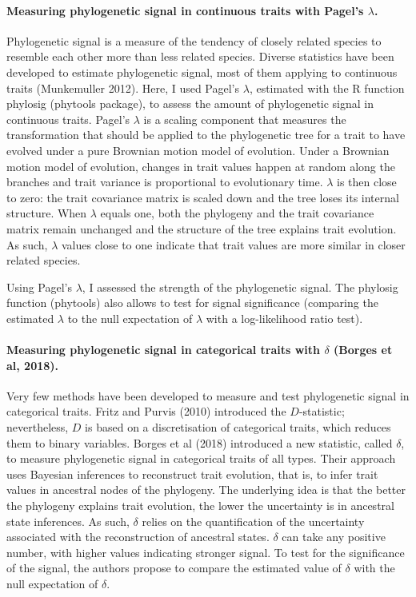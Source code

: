 \paragraph{Measuring phylogenetic signal in continuous traits with Pagel's $\lambda$.}
Phylogenetic signal is a measure of the tendency of closely related species to resemble each other more than less related species. Diverse statistics have been developed to estimate phylogenetic signal, most of them applying to continuous traits (Munkemuller 2012). Here, I used Pagel's $\lambda$, estimated with the R function phylosig (phytools package), to assess the amount of phylogenetic signal in continuous traits. Pagel's $\lambda$ is a scaling component that measures the transformation that should be applied to the phylogenetic tree for a trait to have evolved under a pure Brownian motion model of evolution. Under a Brownian motion model of evolution, changes in trait values happen at random along the branches and trait variance is proportional to evolutionary time.  $\lambda$ is then close to zero: the trait covariance matrix is scaled down and the tree loses its internal structure. When $\lambda$ equals one, both the phylogeny and the trait covariance matrix remain unchanged and the structure of the tree explains trait evolution. As such, $\lambda$ values close to one indicate that trait values are more similar in closer related species.  

Using Pagel's $\lambda$, I assessed the strength of the phylogenetic signal. The phylosig function (phytools) also allows to test for signal significance (comparing the estimated $\lambda$ to the null expectation of $\lambda$ with a log-likelihood ratio test). 

\paragraph{Measuring phylogenetic signal in categorical traits with $\delta$ (Borges et al, 2018).}
Very few methods have been developed to measure and test phylogenetic signal in categorical traits. Fritz and Purvis (2010) introduced the $D$-statistic; nevertheless, $D$ is based on a discretisation of categorical traits, which reduces them to binary variables. Borges et al (2018) introduced a new statistic, called $\delta$, to measure phylogenetic signal in categorical traits of all types. Their approach uses Bayesian inferences to reconstruct trait evolution, that is, to infer trait values in ancestral nodes of the phylogeny. The underlying idea is that the  better the phylogeny explains trait evolution, the lower the uncertainty is in ancestral state inferences. As such, $\delta$ relies on the quantification of the uncertainty associated with the reconstruction of ancestral states. $\delta$ can take any positive number, with higher values indicating stronger signal. To test for the significance of the signal, the authors propose to compare the estimated value of $\delta$ with the null expectation  of $\delta$. 

